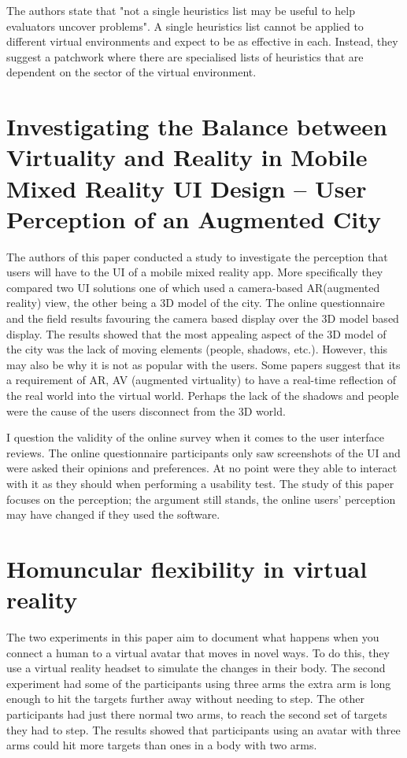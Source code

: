 \documentclass{scrartcl}
\begin{document}
The authors state that "not a single heuristics list may be useful to help evaluators uncover problems"\cite [p.312] {hvannberg2012exploitation}. A single heuristics list cannot be applied to different virtual environments and expect to be as effective in each. Instead, they suggest a patchwork where there are specialised lists of heuristics that are dependent on the sector of the virtual environment.

\section{Investigating the Balance between Virtuality and Reality in Mobile Mixed Reality UI Design – User Perception of an Augmented City\cite{venta2014investigating}}
The authors of this paper conducted a study to investigate the perception that users will have to the UI of a mobile mixed reality app. More specifically they compared two UI solutions one of which used a camera-based AR(augmented reality\cite{azuma2001recent, milgram1994taxonomy}) view, the other being a 3D model of the city. The online questionnaire and the field results favouring the camera based display over the 3D model based display. The results showed that the most appealing aspect of the 3D model of the city was the lack of moving elements (people, shadows, etc.). However, this may also be why it is not as popular with the users. Some papers suggest that its a requirement of AR, AV (augmented virtuality\cite{jang2011overlapping}) to have a real-time reflection of the real world into the virtual world\cite {milgram1994taxonomy,jang2011overlapping}. Perhaps the lack of the shadows and people were the cause of the users disconnect from the 3D world.

I question the validity of the online survey when it comes to the user interface reviews. The online questionnaire participants only saw screenshots of the UI and were asked their opinions and preferences. At no point were they able to interact with it as they should when performing a usability test\cite{rubin2008handbook,nielsen1994usability}. The study of this paper focuses on the perception; the argument still stands, the online users' perception may have changed if they used the software.

\section {Homuncular flexibility in virtual reality\cite{won2015homuncular}}
The two experiments in this paper aim to document what happens when you connect a human to a virtual avatar that moves in novel ways. To do this, they use a virtual reality headset to simulate the changes in their body. The second experiment had some of the participants using three arms the extra arm is long enough to hit the targets further away without needing to step. The other participants had just there normal two arms, to reach the second set of targets they had to step. The results showed that participants using an avatar with three arms could hit more targets than ones in a body with two arms.
\end{document}
